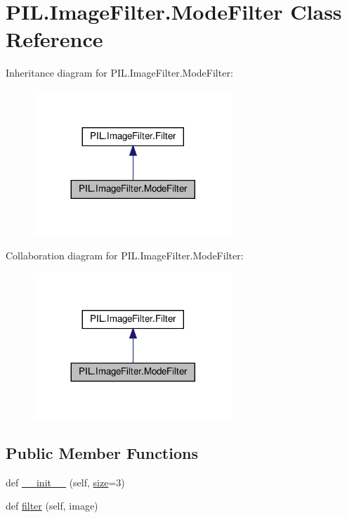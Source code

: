 \hypertarget{classPIL_1_1ImageFilter_1_1ModeFilter}{}\section{P\+I\+L.\+Image\+Filter.\+Mode\+Filter Class Reference}
\label{classPIL_1_1ImageFilter_1_1ModeFilter}


Inheritance diagram for P\+I\+L.\+Image\+Filter.\+Mode\+Filter\+:
\nopagebreak
\begin{figure}[H]
\begin{center}
\leavevmode
\includegraphics[width=212pt]{classPIL_1_1ImageFilter_1_1ModeFilter__inherit__graph}
\end{center}
\end{figure}


Collaboration diagram for P\+I\+L.\+Image\+Filter.\+Mode\+Filter\+:
\nopagebreak
\begin{figure}[H]
\begin{center}
\leavevmode
\includegraphics[width=212pt]{classPIL_1_1ImageFilter_1_1ModeFilter__coll__graph}
\end{center}
\end{figure}
\subsection*{Public Member Functions}
\begin{DoxyCompactItemize}
\item 
def \hyperlink{classPIL_1_1ImageFilter_1_1ModeFilter_ac8790ad26d28c2e826f0cefa2b86bbb1}{\+\_\+\+\_\+init\+\_\+\+\_\+} (self, \hyperlink{classPIL_1_1ImageFilter_1_1ModeFilter_a0464bb9aa5a0c5d3e17878ce56d687a1}{size}=3)
\item 
def \hyperlink{classPIL_1_1ImageFilter_1_1ModeFilter_a7dccb05fae6761aec66e524004bc56a3}{filter} (self, image)
\end{DoxyCompactItemize}
